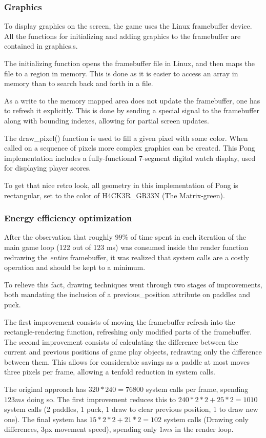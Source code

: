\subsubsection{Graphics}
To display graphics on the screen, the game uses the Linux framebuffer device.
All the functions for initializing and adding graphics to the framebuffer are
contained in graphics.s.

The initializing function opens the framebuffer file in Linux, and then maps the
file to a region in memory. This is done as it is easier to access an array in memory
than to search back and forth in a file.

As a write to the memory mapped area does not update the framebuffer,
one has to refresh it explicitly.
This is done by sending a special signal to the framebuffer
along with bounding indexes, allowing for partial screen updates.

The draw\_pixel() function is used to fill a given pixel with some color.
When called on a sequence of pixels more complex graphics can be created.
This Pong implementation includes a fully-functional 7-segment digital watch display,
used for displaying player scores.

To get that nice retro look, all geometry in this implementation of Pong is rectangular,
set to the color of H4CK3R\_GR33N (The Matrix-green).

\subsubsection{Energy efficiency optimization}
After the observation that roughly $ 99 \% $ of time spent in each iteration of the
main game loop (122 out of 123 ms) was consumed inside the render function redrawing
the \emph{entire} framebuffer,
it was realized that system calls are a costly operation and should be kept to a minimum.

To relieve this fact, drawing techniques went through two stages of improvements,
both mandating the inclusion of a previous\_position attribute on paddles and puck.

The first improvement consists of moving the framebuffer refresh into the
rectangle-rendering function, refreshing only modified parts of the framebuffer.
The second improvement consists of calculating the difference between the current
and previous positions of game play objects, redrawing only the difference between them.
This allows for considerable savings as a paddle at most moves three pixels per frame,
allowing a tenfold reduction in system calls.

The original approach has $ 320 * 240 = 76800 $
system calls per frame, spending $ 123 ms $ doing so.
The first improvement reduces this to $ 240 * 2 * 2+ 25 * 2 = 1010 $ system calls
(2 paddles, 1 puck, 1 draw to clear previous position, 1 to draw new one).
The final system has $ 15 * 2 * 2 + 21 * 2 = 102 $ system calls
(Drawing only differences, 3px movement speed), spending only $ 1 ms $ in the render loop.
